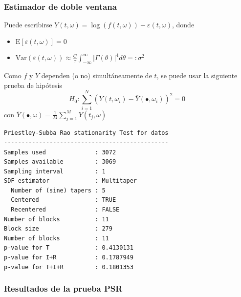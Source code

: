 \documentclass[11pt]{beamer}
\newcommand{\intR}{\int_{-\infty}^{\infty}}
\newcommand{\E}[1]{\mathrm{E}\left[ #1 \right]}
\newcommand{\Var}[1]{\mathrm{Var}\left( #1 \right)}
\newcommand{\abso}[1]{\left| #1 \right|}
\begin{document}

\begin{frame}\frametitle{Estimador de doble ventana}
Puede escribirse
$Y(t,\omega) = \log \left( f(t,\omega) \right) + \varepsilon(t,\omega)$, 
donde 
\begin{itemize}
\item $\displaystyle \E{\varepsilon(t,\omega)} = 0$
\item $\displaystyle \Var{\varepsilon(t,\omega)}
\approx \frac{C}{\tau} \intR \abso{\Gamma (\theta)}^{4} d\theta =: \sigma^{2}$
\end{itemize}

Como $f$ y $Y$  dependen (o no) simult\'aneamente de $t$, se puede usar 
la siguiente prueba de hip\'otesis
\begin{equation*}
H_0 : \sum_{i = 1 }^{N} \left( Y(t,\omega_i) - \overline{Y}(\bullet,\omega_i) \right)^{2} 
= 0
\end{equation*}
con $\overline{Y}(\bullet,\omega) = \frac{1}{M} \sum_{j=1}^{M} Y(t_j,\omega)$
\end{frame}


\begin{lrbox}{\caja}%
\begin{lstlisting}[caption={}]
Priestley-Subba Rao stationarity Test for datos
-----------------------------------------------
Samples used              : 3072 
Samples available         : 3069 
Sampling interval         : 1 
SDF estimator             : Multitaper 
  Number of (sine) tapers : 5 
  Centered                : TRUE 
  Recentered              : FALSE 
Number of blocks          : 11 
Block size                : 279 
Number of blocks          : 11 
p-value for T             : 0.4130131 
p-value for I+R           : 0.1787949 
p-value for T+I+R         : 0.1801353 
\end{lstlisting}
\end{lrbox}%


\begin{frame}[fragile]\frametitle{Resultados de la prueba PSR}
\begin{figure}
\scalebox{0.7}{\usebox{\caja}}
\end{figure}
\end{frame}
\end{document}
